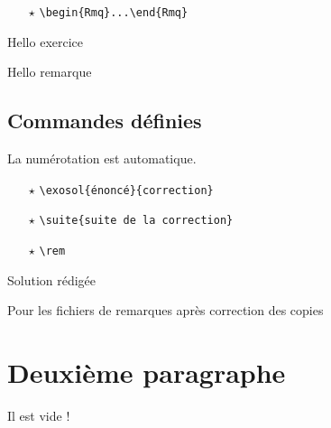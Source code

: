\documentclass[12pt,french]{article}
\begin{document}
\begin{spacing}{1.2}
\begin{itemize}
\item[$\star$] \verb=\begin{Rmq}...\end{Rmq}=\,

\end{itemize}


\begin{Exercice}
Hello exercice
\end{Exercice}

\begin{Rmq}
Hello remarque
\end{Rmq}


\subsection{Commandes définies}

La numérotation est automatique.

\begin{itemize}
\item[$\star$] \verb=\exosol{énoncé}{correction}=\,

\item[$\star$] \verb=\suite{suite de la correction}=\,

\item[$\star$] \verb=\rem=\,

\end{itemize}

{
Solution rédigée
}


Pour les fichiers de remarques après correction des copies

\rem

\rem

\section{Deuxième paragraphe}

Il est vide !


\end{spacing}
\end{document}
